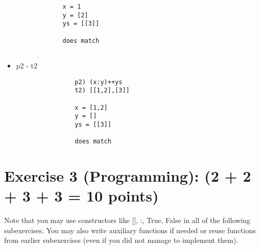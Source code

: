 \documentclass[10pt]{article}
\begin{document}
\begin{itemize}
\begin{paracol}{2}
\begin{itemize}
\begin{addmargin}[-5em]{2em}
\begin{lstlisting}
				x = 1
				y = [2]
				ys = [[3]]
				
				does match
				
				\end{lstlisting}
			\end{addmargin}
		\end{itemize}
		
		\switchcolumn
		
		
		\begin{itemize}
			\item p2 - t2
			\begin{addmargin}[-5em]{2em}
				\begin{lstlisting}
				p2) (x:y)++ys
				t2) [[1,2],[3]]
						
				x = [1,2]
				y = []
				ys = [[3]]
						
				does match
				\end{lstlisting}
			\end{addmargin}
		\end{itemize}
			
	\end{paracol}
	
\end{itemize} 


\section*{Exercise 3 (Programming): (2 + 2 + 3 + 3 = 10 points)}

Note that you may use constructors like [], :, True, False in all of the following subexercises. You may also
write auxiliary functions if needed or reuse functions from earlier subexercises (even if you did not manage to
implement them).
\end{document}
